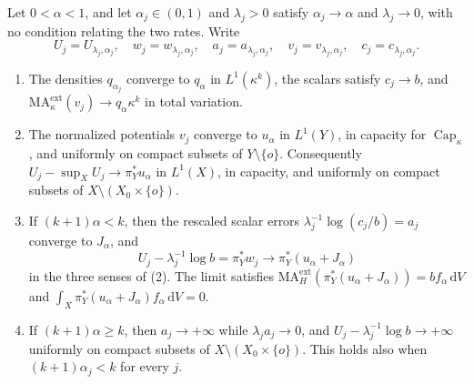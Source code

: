 \begin{theorem}\label{thm:nonlp-selection-limit}
Let $0<\alpha<1$, and let $\alpha_j\in(0,1)$ and $\lambda_j>0$ satisfy $\alpha_j\to\alpha$ and $\lambda_j\to0$, with no condition relating the two rates. Write
\[
 U_j=U_{\lambda_j,\alpha_j},\quad w_j=w_{\lambda_j,\alpha_j},\quad a_j=a_{\lambda_j,\alpha_j},\quad v_j=v_{\lambda_j,\alpha_j},\quad c_j=c_{\lambda_j,\alpha_j}.
\]
\begin{enumerate}
\item The densities $q_{\alpha_j}$ converge to $q_\alpha$ in $L^1(\kappa^k)$, the scalars satisfy $c_j\to b$, and $\mathrm{MA}^{\mathrm{ext}}_\kappa(v_j)\to q_\alpha\kappa^k$ in total variation.
\item The normalized potentials $v_j$ converge to $u_\alpha$ in $L^1(Y)$, in capacity for $\operatorname{Cap}_\kappa$, and uniformly on compact subsets of $Y\setminus\{o\}$. Consequently $U_j-\sup_XU_j\to\pi_Y^*u_\alpha$ in $L^1(X)$, in capacity, and uniformly on compact subsets of $X\setminus(X_0\times\{o\})$.
\item If $(k+1)\alpha<k$, then the rescaled scalar errors $\lambda_j^{-1}\log(c_j/b)=a_j$ converge to $J_\alpha$, and
\[
 U_j-\lambda_j^{-1}\log b=\pi_Y^*w_j\longrightarrow\pi_Y^*(u_\alpha+J_\alpha)
\]
in the three senses of \textup{(2)}. The limit satisfies $\mathrm{MA}^{\mathrm{ext}}_H(\pi_Y^*(u_\alpha+J_\alpha))=bf_\alpha\,\mathrm{d}V$ and $\int_X\pi_Y^*(u_\alpha+J_\alpha)f_\alpha\,\mathrm{d}V=0$.
\item If $(k+1)\alpha\geq k$, then $a_j\to+\infty$ while $\lambda_ja_j\to0$, and $U_j-\lambda_j^{-1}\log b\to+\infty$ uniformly on compact subsets of $X\setminus(X_0\times\{o\})$. This holds also when $(k+1)\alpha_j<k$ for every $j$.
\end{enumerate}
\end{theorem}
